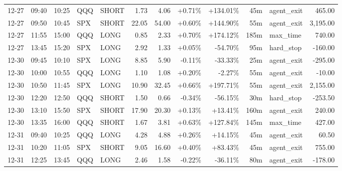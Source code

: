 \documentclass[11pt,a4paper,twoside]{article}
\begin{document}
\begin{center}
\begin{longtable}{>{\color{txtmain}}l l l l l r r r r r >{\color{txtmain}}l r}
12-27 & 09:40 & 10:25 & QQQ & SHORT & 1.73 & 4.06 & \textcolor{wingreen}{+0.71\%} & \textcolor{wingreen}{+134.01\%} & 45m & agent\_exit & \textcolor{wingreen}{465.00} \\
12-27 & 09:50 & 10:45 & SPX & SHORT & 22.05 & 54.00 & \textcolor{wingreen}{+0.60\%} & \textcolor{wingreen}{+144.90\%} & 55m & agent\_exit & \textcolor{wingreen}{3,195.00} \\
12-27 & 11:55 & 15:00 & QQQ & LONG & 0.85 & 2.33 & \textcolor{wingreen}{+0.70\%} & \textcolor{wingreen}{+174.12\%} & 185m & max\_time & \textcolor{wingreen}{740.00} \\
12-27 & 13:45 & 15:20 & SPX & LONG & 2.92 & 1.33 & \textcolor{wingreen}{+0.05\%} & \textcolor{lossred}{-54.70\%} & 95m & hard\_stop & \textcolor{lossred}{-160.00} \\
12-30 & 09:45 & 10:10 & SPX & LONG & 8.85 & 5.90 & \textcolor{lossred}{-0.11\%} & \textcolor{lossred}{-33.33\%} & 25m & agent\_exit & \textcolor{lossred}{-295.00} \\
12-30 & 10:00 & 10:55 & QQQ & LONG & 1.10 & 1.08 & \textcolor{wingreen}{+0.20\%} & \textcolor{lossred}{-2.27\%} & 55m & agent\_exit & \textcolor{lossred}{-10.00} \\
12-30 & 10:50 & 11:45 & SPX & LONG & 10.90 & 32.45 & \textcolor{wingreen}{+0.66\%} & \textcolor{wingreen}{+197.71\%} & 55m & agent\_exit & \textcolor{wingreen}{2,155.00} \\
12-30 & 12:20 & 12:50 & QQQ & SHORT & 1.50 & 0.66 & \textcolor{lossred}{-0.34\%} & \textcolor{lossred}{-56.15\%} & 30m & hard\_stop & \textcolor{lossred}{-253.50} \\
12-30 & 13:10 & 15:50 & SPX & SHORT & 17.90 & 20.30 & \textcolor{wingreen}{+0.13\%} & \textcolor{wingreen}{+13.41\%} & 160m & agent\_exit & \textcolor{wingreen}{240.00} \\
12-30 & 13:35 & 16:00 & QQQ & SHORT & 1.67 & 3.81 & \textcolor{wingreen}{+0.63\%} & \textcolor{wingreen}{+127.84\%} & 145m & max\_time & \textcolor{wingreen}{427.00} \\
12-31 & 09:40 & 10:25 & QQQ & LONG & 4.28 & 4.88 & \textcolor{wingreen}{+0.26\%} & \textcolor{wingreen}{+14.15\%} & 45m & agent\_exit & \textcolor{wingreen}{60.50} \\
12-31 & 10:20 & 11:05 & SPX & SHORT & 9.05 & 16.60 & \textcolor{wingreen}{+0.40\%} & \textcolor{wingreen}{+83.43\%} & 45m & agent\_exit & \textcolor{wingreen}{755.00} \\
12-31 & 12:25 & 13:45 & QQQ & LONG & 2.46 & 1.58 & \textcolor{lossred}{-0.22\%} & \textcolor{lossred}{-36.11\%} & 80m & agent\_exit & \textcolor{lossred}{-178.00} \\

\end{longtable}
\end{center}
\end{document}

